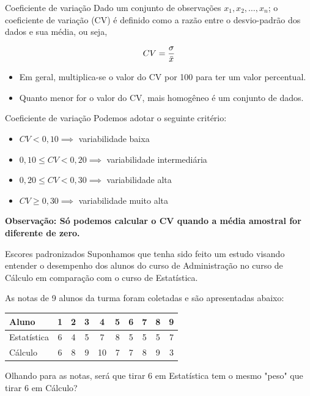 \begin{frame}{Coeficiente de variação}
Dado um conjunto de observações $x_1, x_2, \dots, x_n$; o coeficiente de variação
(CV) é definido como a razão entre o desvio-padrão dos dados e sua média,
ou seja,

 $$CV = \dfrac{\sigma}{\Bar{x}}$$

 \begin{itemize}
    \item Em geral, multiplica-se o valor do CV por 100 para ter um valor percentual. 
    \pause
    \item Quanto menor for o valor do CV, mais homogêneo é um conjunto de dados.
 \end{itemize}
\end{frame}

\begin{frame}{Coeficiente de variação}
    Podemos adotar o seguinte critério:
    \begin{itemize}
        \item $CV < 0,10 \implies$ variabilidade baixa 
        \item $0,10 \leq CV < 0,20 \implies$ variabilidade intermediária
        \item $0,20 \leq CV < 0,30 \implies$ variabilidade alta
        \item $CV \geq 0,30 \implies$ variabilidade muito alta
    \end{itemize}

    \textbf{Observação: Só podemos calcular o CV quando a média amostral for diferente de zero.}
\end{frame}

\begin{frame}{Escores padronizados}
    Suponhamos que tenha sido feito um estudo visando entender o desempenho dos alunos do curso de Administração no curso de Cálculo em comparação com o curso de Estatística. 
    \pause
    \vspace{5px}
    
    As notas de 9 alunos da turma foram coletadas e são apresentadas abaixo:

    \centering
    \begin{tabular}{lccccccccc}
    \toprule
    Aluno & 1 & 2 & 3 & 4 & 5 & 6 & 7 & 8 & 9 \\
    \midrule
    Estatística & 6 & 4 & 5 & 7 & 8 & 5 & 5 & 5 & 7 \\
    Cálculo     & 6 & 8 & 9 & 10 & 7 & 7 & 8 & 9 & 3 \\
    \bottomrule
    \end{tabular}

    Olhando para as notas, será que tirar 6 em Estatística tem o mesmo "peso" que tirar 6 em Cálculo?
\end{frame}

